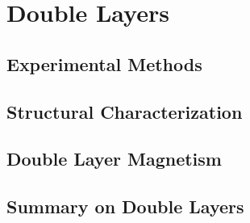 \documentclass[\main/dresen_thesis.tex]{subfiles}
\renewcommand{\thisPath}{\main/chapters/doublelayers}
\begin{document}
\chapter{Double Layers}\label{ch:doublelayers}
  
  \FloatBarrier
  \clearpage

  \section{Experimental Methods}
    
      \FloatBarrier

  \section{Structural Characterization}
    
    \FloatBarrier

  \section{Double Layer Magnetism}
    
    \FloatBarrier

  \clearpage
  \section{Summary on Double Layers}
    
    \FloatBarrier
\end{document}
